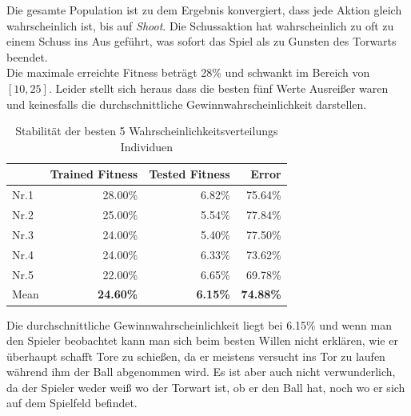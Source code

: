                 \noindent
                Die gesamte Population ist zu dem Ergebnis konvergiert, dass jede Aktion gleich wahrscheinlich ist, bis auf \textit{Shoot}. Die Schussaktion hat wahrscheinlich zu oft zu einem Schuss ins Aus geführt, was sofort das Spiel als zu Gunsten des Torwarts beendet.\\

                \noindent
                Die maximale erreichte Fitness beträgt 28\% und schwankt im Bereich von $[10,25]$. Leider stellt sich heraus dass die besten fünf Werte Ausreißer waren und keinesfalls die durchschnittliche Gewinnwahrscheinlichkeit darstellen. 

                \begin{table}[H]
                    \begin{center}
                    \begin{tabular}{ |l|r|r|r| } 
                        \hline
                        \hfill & Trained Fitness   & Tested Fitness  &          Error    \\ \hline
                          Nr.1 &          28.00\%  &          6.82\% &          75.64\%  \\  
                          Nr.2 &          25.00\%  &          5.54\% &          77.84\%  \\  
                          Nr.3 &          24.00\%  &          5.40\% &          77.50\%  \\ 
                          Nr.4 &          24.00\%  &          6.33\% &          73.62\%  \\ 
                          Nr.5 &          22.00\%  &          6.65\% &          69.78\%  \\ \hline
                          Mean &  \textbf{24.60\%} & \textbf{6.15\%} & \textbf{74.88\%}  \\ \hline
                    \end{tabular}
                    \end{center}
                    \caption{Stabilität der besten 5 Wahrscheinlichkeitsverteilungs Individuen \label{fig:actiondisttable}}
                \end{table}
                \noindent
                Die durchschnittliche Gewinnwahrscheinlichkeit liegt bei 6.15\% und wenn man den Spieler beobachtet kann man sich beim besten Willen nicht erklären, wie er überhaupt schafft Tore zu schießen, da er meistens versucht ins Tor zu laufen während ihm der Ball abgenommen wird. Es ist aber auch nicht verwunderlich, da der Spieler weder weiß wo der Torwart ist, ob er den Ball hat, noch wo er sich auf dem Spielfeld befindet. \\

